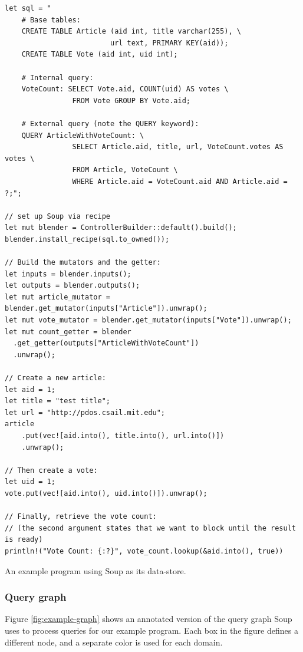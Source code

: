 \documentclass[b5paper]{report}
\begin{document}
\begin{listing}[H]
  \begin{verbatim}
let sql = "
    # Base tables:
    CREATE TABLE Article (aid int, title varchar(255), \
                         url text, PRIMARY KEY(aid));
    CREATE TABLE Vote (aid int, uid int);

    # Internal query:
    VoteCount: SELECT Vote.aid, COUNT(uid) AS votes \
                FROM Vote GROUP BY Vote.aid;

    # External query (note the QUERY keyword):
    QUERY ArticleWithVoteCount: \
                SELECT Article.aid, title, url, VoteCount.votes AS votes \
                FROM Article, VoteCount \
                WHERE Article.aid = VoteCount.aid AND Article.aid = ?;";

// set up Soup via recipe
let mut blender = ControllerBuilder::default().build();
blender.install_recipe(sql.to_owned());

// Build the mutators and the getter:
let inputs = blender.inputs();
let outputs = blender.outputs();
let mut article_mutator = blender.get_mutator(inputs["Article"]).unwrap();
let mut vote_mutator = blender.get_mutator(inputs["Vote"]).unwrap();
let mut count_getter = blender
  .get_getter(outputs["ArticleWithVoteCount"])
  .unwrap();

// Create a new article:
let aid = 1;
let title = "test title";
let url = "http://pdos.csail.mit.edu";
article
    .put(vec![aid.into(), title.into(), url.into()])
    .unwrap();

// Then create a vote:
let uid = 1;
vote.put(vec![aid.into(), uid.into()]).unwrap();

// Finally, retrieve the vote count:
// (the second argument states that we want to block until the result is ready)
println!("Vote Count: {:?}", vote_count.lookup(&aid.into(), true))
  \end{verbatim}
  \caption{
    An example program using Soup as its data-store.
    \label{lst:soup-example}
  }
\end{listing}

\subsubsection{Query graph}
Figure \ref{fig:example-graph} shows an annotated version of the query graph
Soup uses to process queries for our example program. Each box in the figure
defines a different node, and a separate color is used for each domain.
\end{document}
